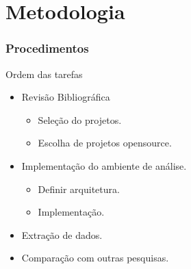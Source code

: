 \documentclass[]{beamer}
\begin{document}
	\section{Metodologia}
	\begin{frame}[label=metodologia, fragile]
		\frametitle{Procedimentos}
		\begin{block}{Ordem das tarefas}
			\begin{itemize}
				\item Revisão Bibliográfica
					\begin{itemize}
						\item Seleção do projetos.
						\item Escolha de projetos opensource.
					\end{itemize}
				\item Implementação do ambiente de análise.
					\begin{itemize}
						\item Definir arquitetura.
						\item Implementação.
					\end{itemize}
			
				\item Extração de dados.
				\item Comparação com outras pesquisas.
			\end{itemize}
		\end{block}
	\end{frame}
	
\end{document}
